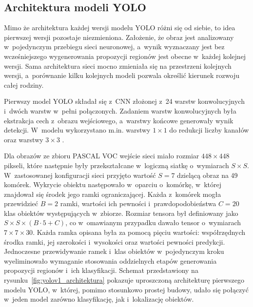 \subsection{Architektura modeli YOLO}

Mimo że architektura każdej wersji modelu YOLO różni się od siebie, to idea pierwszej wersji pozostaje niezmieniona. Założenie, że obraz jest analizowany w~pojedynczym przebiegu sieci neuronowej, a~wynik wyznaczany jest bez wcześniejszego wygenerowania propozycji regionów jest obecne w~każdej kolejnej wersji. Sama architektura sieci mocno zmieniała się na przestrzeni kolejnych wersji, a~porównanie kilku kolejnych modeli pozwala określić kierunek rozwoju całej rodziny.


Pierwszy model YOLO składał się z~CNN złożonej z~24 warstw konwolucyjnych i~dwóch warstw w~pełni połączonych. Zadaniem warstw konwolucyjnych była ekstrakcja cech z~obrazu wejściowego, a~warstwy końcowe generowały wynik detekcji. W~modelu wykorzystano m.in. warstwy $1 \times 1$ do redukcji liczby kanałów oraz warstwy $3 \times 3$ \cite{bib:redmon2016lookonceunifiedrealtime}.

Dla obrazów ze zbioru PASCAL VOC wejście sieci miało rozmiar $448 \times 448$ pikseli, które następnie były przekształcane w~logiczną siatkę o~wymiarach $S \times S$. W~zastosowanej konfiguracji sieci przyjęto wartość $S=7$ dzielącą obraz na 49 komórek. Wykrycie obiektu następowało w~oparciu o~komórkę, w~której znajdował się środek jego ramki ograniczającej. Każda z~komórek mogła przewidzieć $B=2$ ramki, wartości ich pewności i~prawdopodobieństwa $C=20$ klas obiektów występujących w~zbiorze. Rozmiar tensora był definiowany jako $S \times S \times (B \cdot 5 + C)$, co w~omawianym przypadku dawało tensor o~wymiarach $7 \times 7 \times 30$. Każda ramka opisana była za pomocą pięciu wartości: współrzędnych środka ramki, jej szerokości i~wysokości oraz wartości pewności predykcji. Jednoczesne przewidywanie ramek i~klas obiektów w~pojedynczym kroku wyeliminowało wymaganie stosowania oddzielnych etapów generowania propozycji regionów i~ich klasyfikacji. Schemat przedstawiony na rysunku~\ref{fig:yolov1_architektura} pokazuje uproszczoną architekturę pierwszego modelu YOLO, w~której, pomimo stosunkowo prostej budowy, udało się połączyć w~jeden model zarówno klasyfikację, jak i~lokalizację obiektów.


